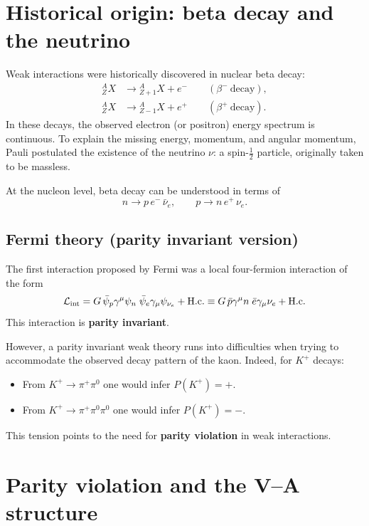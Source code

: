 \section{Historical origin: beta decay and the neutrino}
Weak interactions were historically discovered in nuclear beta decay:
\begin{align}
  {}^{A}_{Z}X &\to {}^{A}_{Z+1}X + e^- \qquad (\beta^-~\text{decay}),\\
  {}^{A}_{Z}X &\to {}^{A}_{Z-1}X + e^+ \qquad (\beta^+~\text{decay}).
\end{align}
In these decays, the observed electron (or positron) energy spectrum is continuous.
To explain the missing energy, momentum, and angular momentum, Pauli postulated the existence
of the neutrino $\nu$: a spin-$\tfrac12$ particle, originally taken to be massless.

At the nucleon level, beta decay can be understood in terms of
\begin{equation}
n \to p\,e^-\,\bar\nu_e,
\qquad
p \to n\,e^+\,\nu_e.
\end{equation}

\subsection{Fermi theory (parity invariant version)}
The first interaction proposed by Fermi was a local four-fermion interaction of the form
\begin{equation}
\mathcal{L}_{\rm int}
=
G\,\bar\psi_p\gamma^\mu\psi_n\;\bar\psi_e\gamma_\mu\psi_{\nu_e}
+\text{H.c.}
\equiv
G\,\bar p\gamma^\mu n\;\bar e\gamma_\mu\nu_e+\text{H.c.}
\end{equation}
This interaction is \textbf{parity invariant}.

However, a parity invariant weak theory runs into difficulties when trying to accommodate
the observed decay pattern of the kaon. Indeed, for $K^+$ decays:
\begin{itemize}
  \item From $K^+ \to \pi^+\pi^0$ one would infer $P(K^+)=+$.
  \item From $K^+ \to \pi^+\pi^0\pi^0$ one would infer $P(K^+)=-$.
\end{itemize}
This tension points to the need for \textbf{parity violation} in weak interactions.

\section{Parity violation and the V--A structure}
